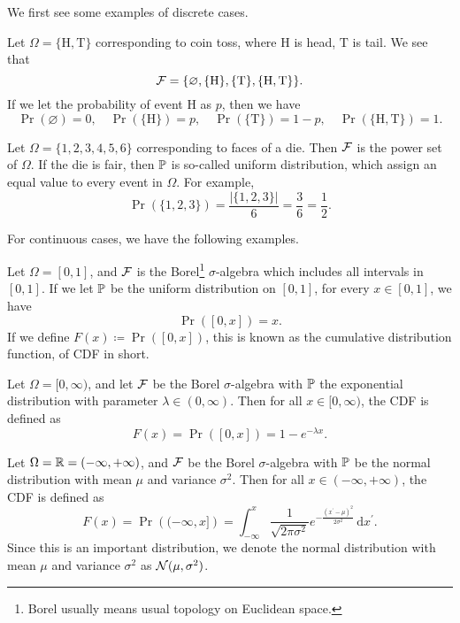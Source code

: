 We first see some examples of discrete cases.
\begin{eg}
	Let \(\Omega = \{\mathrm{H}, \mathrm{T}\}\) corresponding to coin toss, where \(\mathrm{H}\) is head, \(\mathrm{T}\) is tail. We see that
	\[
		\mathcal{\MakeUppercase{f}} = \{\varnothing , \{\mathrm{H} \}, \{\mathrm{T} \}, \{\mathrm{H} , \mathrm{T} \}\}.
	\]
	If we let the probability of event \(\mathrm{H} \) as \(p\), then we have
	\[
		\Pr(\varnothing ) = 0,\quad \Pr(\{\mathrm{H}\}) = p,\quad \Pr(\{\mathrm{T} \}) = 1 - p,\quad \Pr(\{\mathrm{H} , \mathrm{T} \}) = 1.
	\]
\end{eg}

\begin{eg}
	Let \(\Omega = \{1, 2, 3, 4, 5, 6\}\) corresponding to faces of a die. Then \(\mathcal{\MakeUppercase{f}} \) is the power set of \(\Omega \). If the die is fair, then
	\(\mathbb{\MakeUppercase{p}} \) is so-called uniform distribution, which assign an equal value to every event in \(\Omega \). For example,
	\[
		\Pr(\{1, 2, 3\}) = \frac{\left\vert \{1, 2, 3\} \right\vert }{6} = \frac{3}{6} = \frac{1}{2}.
	\]
\end{eg}

For continuous cases, we have the following examples.
\begin{eg}
	Let \(\Omega = [0, 1]\), and \(\mathcal{\MakeUppercase{f}}\) is the Borel\footnote{Borel usually means usual topology on Euclidean space.} \(\sigma \)-algebra which includes all intervals in \([0, 1]\).
	If we let \(\mathbb{\MakeUppercase{p}} \) be the uniform distribution on \([0, 1]\), for every \(x\in [0, 1]\), we have
	\[
		\Pr([0, x]) = x.
	\]
	If we define \(F(x)\coloneqq \Pr([0, x]) \), this is known as the cumulative distribution function, of CDF in short.
\end{eg}

\begin{eg}
	Let \(\Omega = [0, \infty )\), and let \(\mathcal{\MakeUppercase{f}} \) be the Borel \(\sigma \)-algebra with \(\mathbb{\MakeUppercase{p}} \) the
	exponential distribution with parameter \(\lambda \in (0, \infty )\). Then for all \(x\in [0, \infty )\), the CDF is defined as
	\[
		F(x) = \Pr([0, x]) = 1 - e^{-\lambda x}.
	\]
\end{eg}

\begin{eg}
	Let \(\Omega = \mathbb{\MakeUppercase{r}} = (-\infty , +\infty )\), and \(\mathcal{\MakeUppercase{f}}\) be the Borel \(\sigma\)-algebra with \(\mathbb{\MakeUppercase{p}}\)
	be the normal distribution with mean \(\mu \) and variance \(\sigma ^{2} \). Then for all \(x\in (-\infty , +\infty )\), the CDF is defined as
	\[
		F(x) = \Pr\left( (-\infty , x] \right)  = \int_{-\infty}^{x} \frac{1}{\sqrt{2\pi \sigma ^{2} } } e^{- \frac{(x^\prime  - \mu )^{2} }{2 \sigma ^{2} }} \,\mathrm{d}x^\prime.
	\]
	Since this is an important distribution, we denote the normal distribution with mean \(\mu\) and variance \(\sigma ^{2} \) as \(\mathcal{\MakeUppercase{n}} (\mu , \sigma ^{2} )\).
\end{eg}

